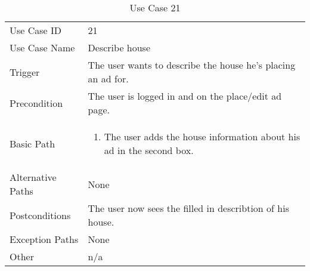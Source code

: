 \begin{table}[H]
\centering
\label{table-use-case-21}
\begin{tabular}{|p{3cm}|p{10cm}}
Use Case ID       & 21                                                      \\
Use Case Name     & Describe house                            \\
Trigger           & The user wants to describe the house he's placing an ad for.\\
Precondition      & The user is logged in and on the place/edit ad page.            
\\
Basic Path        & \begin{enumerate}
\item		The user adds the house information about his ad in the second box. 
\end{enumerate} 
     \\
Alternative Paths & None                          \\
Postconditions    & The user now sees the filled in describtion of his house.	\\
Exception Paths   & None			\\
Other             & n/a                                                                                                                                                                                                        
\end{tabular}
\caption{Use Case 21}
\end{table}

